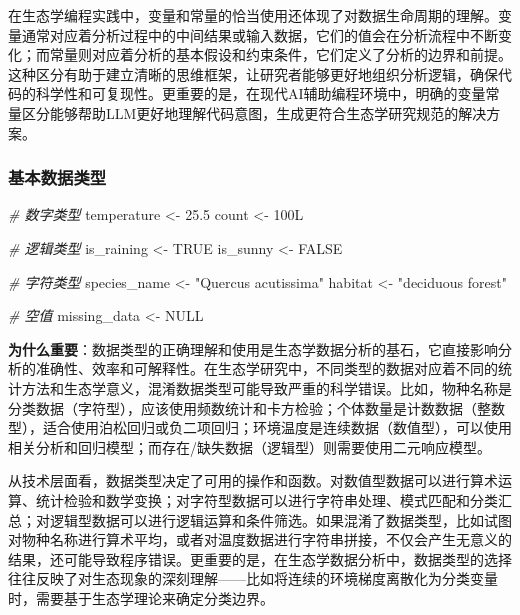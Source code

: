 \documentclass[
]{book}
\newenvironment{Shaded}{\begin{snugshade}}{\end{snugshade}}
\newcommand{\CommentTok}[1]{\textcolor[rgb]{0.56,0.35,0.01}{\textit{#1}}}
\newcommand{\ConstantTok}[1]{\textcolor[rgb]{0.56,0.35,0.01}{#1}}
\newcommand{\DataTypeTok}[1]{\textcolor[rgb]{0.13,0.29,0.53}{#1}}
\newcommand{\DecValTok}[1]{\textcolor[rgb]{0.00,0.00,0.81}{#1}}
\newcommand{\FloatTok}[1]{\textcolor[rgb]{0.00,0.00,0.81}{#1}}
\newcommand{\NormalTok}[1]{#1}
\newcommand{\OtherTok}[1]{\textcolor[rgb]{0.56,0.35,0.01}{#1}}
\newcommand{\StringTok}[1]{\textcolor[rgb]{0.31,0.60,0.02}{#1}}
\begin{document}
在生态学编程实践中，变量和常量的恰当使用还体现了对数据生命周期的理解。变量通常对应着分析过程中的中间结果或输入数据，它们的值会在分析流程中不断变化；而常量则对应着分析的基本假设和约束条件，它们定义了分析的边界和前提。这种区分有助于建立清晰的思维框架，让研究者能够更好地组织分析逻辑，确保代码的科学性和可复现性。更重要的是，在现代AI辅助编程环境中，明确的变量常量区分能够帮助LLM更好地理解代码意图，生成更符合生态学研究规范的解决方案。

\hypertarget{ux57faux672cux6570ux636eux7c7bux578b}{%
\subsubsection{基本数据类型}\label{ux57faux672cux6570ux636eux7c7bux578b}}

\begin{Shaded}
\begin{Highlighting}[]
\CommentTok{\# 数字类型}
\NormalTok{temperature }\OtherTok{\textless{}{-}} \FloatTok{25.5}
\NormalTok{count }\OtherTok{\textless{}{-}} \DecValTok{100}\DataTypeTok{L}

\CommentTok{\# 逻辑类型}
\NormalTok{is\_raining }\OtherTok{\textless{}{-}} \ConstantTok{TRUE}
\NormalTok{is\_sunny }\OtherTok{\textless{}{-}} \ConstantTok{FALSE}

\CommentTok{\# 字符类型}
\NormalTok{species\_name }\OtherTok{\textless{}{-}} \StringTok{"Quercus acutissima"}
\NormalTok{habitat }\OtherTok{\textless{}{-}} \StringTok{"deciduous forest"}

\CommentTok{\# 空值}
\NormalTok{missing\_data }\OtherTok{\textless{}{-}} \ConstantTok{NULL}
\end{Highlighting}
\end{Shaded}

\textbf{为什么重要}：数据类型的正确理解和使用是生态学数据分析的基石，它直接影响分析的准确性、效率和可解释性。在生态学研究中，不同类型的数据对应着不同的统计方法和生态学意义，混淆数据类型可能导致严重的科学错误。比如，物种名称是分类数据（字符型），应该使用频数统计和卡方检验；个体数量是计数数据（整数型），适合使用泊松回归或负二项回归；环境温度是连续数据（数值型），可以使用相关分析和回归模型；而存在/缺失数据（逻辑型）则需要使用二元响应模型。

从技术层面看，数据类型决定了可用的操作和函数。对数值型数据可以进行算术运算、统计检验和数学变换；对字符型数据可以进行字符串处理、模式匹配和分类汇总；对逻辑型数据可以进行逻辑运算和条件筛选。如果混淆了数据类型，比如试图对物种名称进行算术平均，或者对温度数据进行字符串拼接，不仅会产生无意义的结果，还可能导致程序错误。更重要的是，在生态学数据分析中，数据类型的选择往往反映了对生态现象的深刻理解------比如将连续的环境梯度离散化为分类变量时，需要基于生态学理论来确定分类边界。
\end{document}
